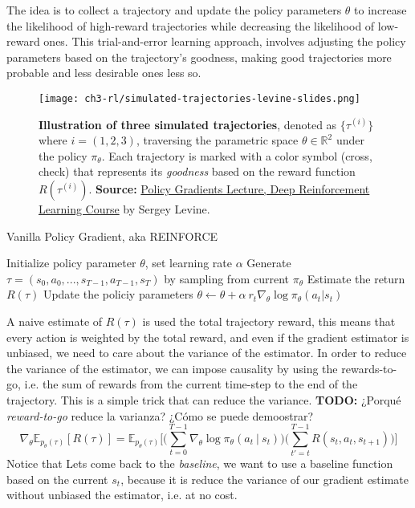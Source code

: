 The idea is to collect a trajectory and update the policy parameters $\theta$ to increase the likelihood of high-reward trajectories while decreasing the likelihood of low-reward ones. This trial-and-error learning approach, involves adjusting the policy parameters based on the trajectory's goodness, making good trajectories more probable and less desirable ones less so.
\begin{figure}[ht]
    \centering
    \texttt{[image: ch3-rl/simulated-trajectories-levine-slides.png]}
    \captionsetup{width=\textwidth} %
    \caption{\textbf{Illustration of three simulated trajectories}, denoted as $\{\tau^{(i)}\}$ where $i=(1,2,3)$, traversing the parametric space $\theta\in\mathbb{R}^2$ under the policy $\pi_{\theta}$. Each trajectory is marked with a color symbol (cross, check) that represents its \textit{goodness} based on the reward function $R(\tau^{(i)})$. \textbf{Source:} \href{https://rail.eecs.berkeley.edu/deeprlcourse/}{Policy Gradients Lecture, Deep Reinforcement Learning Course} by Sergey Levine.}
    \label{fig:anatomy-rl-trajectories}
  \end{figure}

\begin{algorithm}
    \caption{Vanilla Policy Gradient, aka REINFORCE}
    \begin{algorithmic}
    \STATE Initialize policy parameter $\theta$, set learning rate $\alpha$
    \STATE Generate $\tau=(s_0, a_0, ..., s_{T-1}, a_{T-1}, s_{T})$ by sampling from current $\pi_{\theta}$
        \STATE Estimate the return $R(\tau)$
        \STATE Update the policiy parameters $\theta \leftarrow \theta + \alpha~r_{t}\nabla_{\theta}\log\pi_{\theta}(a_{t}|s_{t})$
    \ENDFOR
    \end{algorithmic}
\end{algorithm}
A naive estimate of $R(\tau)$ is used the total trajectory reward, this means
that every action is weighted by the total reward, and even if the gradient
estimator is unbiased, we need to care about the variance of the estimator.
In order to reduce the variance of the estimator, we can impose causality
by using the rewards-to-go, i.e. the sum of rewards from the current time-step
to the end of the trajectory. This is a simple trick that can reduce the variance. \textbf{TODO:} ¿Porqué \textit{reward-to-go} reduce la varianza? ¿Cómo se puede
demoostrar?
\begin{equation}\label{eqn:reinforce-gradient-reward-to-go}
    \nabla_{\theta}\mathbb{E}_{p_{\theta}(\tau)}[R(\tau)] = \mathbb{E}_{p_{\theta}(\tau)}\bigg[\bigg(\sum_{t=0}^{T-1} \nabla_{\theta}\log \pi_{\theta} (a_t~|~s_t)\bigg) \bigg(\sum_{t'=t}^{T-1}R(s_{t}, a_{t}, s_{t+1})\bigg)\bigg] 
\end{equation}
Notice that 
Lets come back to the \textit{baseline}, we want to use a baseline function
based on the current $s_{t}$, because it is reduce the variance of our gradient
estimate without unbiased the estimator, i.e. at no cost.

